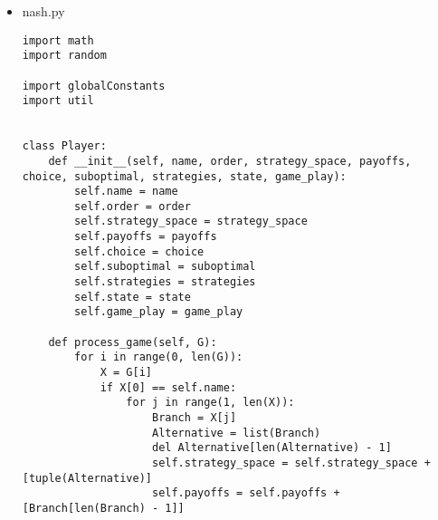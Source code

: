 \begin{itemize}
\begin{lstlisting}[style=fsharpstyle]
def add(x, y):
    return list(map(lambda a, b: a + b, x, y))


def make_histogramm(array, player_name, path):
    plt.hist(array, histtype='step')
    file_name = str(player_name) + ".png"
    try:
        os.mkdir(path, mode=0o777)
    except OSError:
        pass
    plt.savefig(path + file_name, format='png')


def make_all_calculations(array, player_name, file):
    file.write(str(player_name + "'s average = " + str(float(sum(array)) / len(array)) + "\n"))
    file.write(str(player_name + "'s standard deviation = " + str(std(array)) + "\n"))
    file.write(str(player_name + "'s asymmetry = " + str(st.skew(array, bias=False)) + "\n"))
    file.write(str(player_name + "'s excess = " + str(st.kurtosis(array, bias=False)) + "\n"))


def create_all_stats(array, player_name, time):
    path = "results/game" + str(time) + "/"
    make_histogramm(array, player_name, path)

    file = open(path + "allEquations.txt", "a")
    make_all_calculations(array, player_name, file)

 \end{lstlisting}

\item nash.py

 \begin{lstlisting}[style=fsharpstyle]
import math
import random

import globalConstants
import util


class Player:
    def __init__(self, name, order, strategy_space, payoffs, choice, suboptimal, strategies, state, game_play):
        self.name = name
        self.order = order
        self.strategy_space = strategy_space
        self.payoffs = payoffs
        self.choice = choice
        self.suboptimal = suboptimal
        self.strategies = strategies
        self.state = state
        self.game_play = game_play

    def process_game(self, G):
        for i in range(0, len(G)):
            X = G[i]
            if X[0] == self.name:
                for j in range(1, len(X)):
                    Branch = X[j]
                    Alternative = list(Branch)
                    del Alternative[len(Alternative) - 1]
                    self.strategy_space = self.strategy_space + [tuple(Alternative)]
                    self.payoffs = self.payoffs + [Branch[len(Branch) - 1]]


\end{lstlisting}
\end{itemize}
